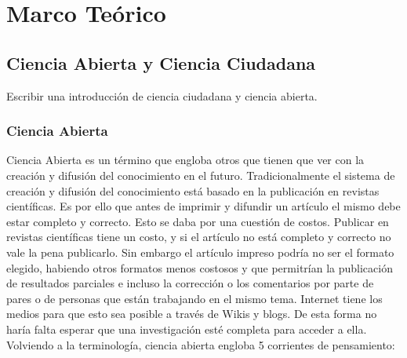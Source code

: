 \chapter{Marco Teórico}
\section{Ciencia  Abierta y Ciencia Ciudadana}

Escribir una introducción de ciencia ciudadana y ciencia abierta.

\subsection{Ciencia Abierta}
Ciencia Abierta es un término que engloba otros que tienen que ver con la creación y difusión del conocimiento en el futuro. Tradicionalmente el sistema de creación y difusión del conocimiento está basado en la publicación en revistas científicas. Es por ello que antes de imprimir y difundir un artículo el mismo debe estar completo y correcto. Esto se daba por una cuestión de costos. Publicar en revistas científicas tiene un costo, y si el artículo no está completo y correcto no vale la pena publicarlo. Sin embargo el artículo impreso podría no ser el formato elegido, habiendo otros formatos menos costosos y que permitrían la publicación de resultados parciales e incluso la corrección o los comentarios por parte de pares o de personas que están trabajando en el mismo tema. Internet tiene los medios para que esto sea posible a través de Wikis y blogs. De esta forma no haría falta esperar que una investigación esté completa para acceder a ella. \cite{bartling2014opening}
Volviendo a la terminología, ciencia abierta engloba 5 corrientes de pensamiento:
